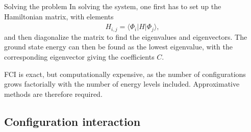 \documentclass[UKenglish,aspectratio=169]{beamer}
\begin{document}
\begin{frame}{Solving the problem}
    In solving the system, one first has to set up the Hamiltonian
    matrix, with elements
    \begin{equation}
        H_{i, j} = \langle \Phi_i \lvert \hat{H} \rvert \Phi_j \rangle,
    \end{equation}
    and then diagonalize the matrix to find the eigenvalues and eigenvectors.
    The ground state energy can then be found as the lowest
    eigenvalue, with the corresponding eigenvector giving the coefficients $C$.

    \bigskip

    FCI is exact, but computationally expensive, as the number of
    configurations grows factorially with the number of energy levels included.
    Approximative methods are therefore required.
\end{frame}

\subsection{Configuration interaction}
\end{document}
